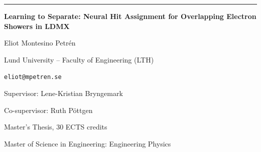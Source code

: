 




\begin{titlepage}
\begin{center}
  \noindent\rule{\textwidth}{4pt}
  \vspace{0.20in}

  {\LARGE \bfseries Learning to Separate: Neural Hit Assignment for Overlapping Electron Showers in LDMX \par}
  \vspace{0.7em}










  {\large Eliot Montesino Petrén\par}
  \vspace{0.35em}
  {\normalsize Lund University -- Faculty of Engineering (LTH)\par}
  \vspace{0.2em}
  {\normalsize \texttt{eliot@mpetren.se}\par}
  \vspace{0.45em}
  {\normalsize Supervisor: Lene-Kristian Bryngemark\par}
  {\normalsize Co-supervisor: Ruth Pöttgen\par}

  \vspace{0.7em}
  {\normalsize Master's Thesis, 30 ECTS credits\par}
  {\normalsize Master of Science in Engineering: Engineering Physics\par}


\end{center}
\end{titlepage}
